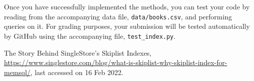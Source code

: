\documentclass[addpoints]{exam}
\begin{document}
Once you have successfully implemented the methods, you can test your code by reading from the accompanying data file, \texttt{data/books.csv}, and performing queries on it. For grading purposes, your submission will be tested automatically by GitHub using the accompanying  file, \texttt{test\_index.py}.

\newpage


\newpage
\newpage
\begin{thebibliography}{9}

  The Story Behind SingleStore’s Skiplist Indexes, \url{https://www.singlestore.com/blog/what-is-skiplist-why-skiplist-index-for-memsql/}, last accessed on 16 Feb 2022.
  \end{thebibliography}
\end{document}
